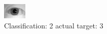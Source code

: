 \begin{figure}[h!]
\begin{center}
\includegraphics[width=0.60\columnwidth]{figures/ID1033_class_2_target_3.png}
\end{center}
\caption{ Classification: 2 actual target: 3}
\label{fig:ID1033_class_2_target_3}
\end{figure}

